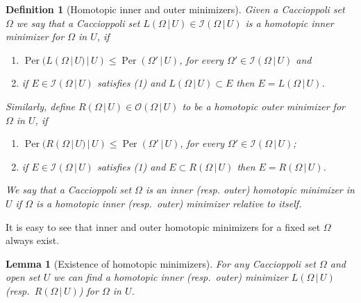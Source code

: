 \documentclass[12pt,twoside]{amsart}
\numberwithin{equation}{section}
\renewcommand{\leq}{\leqslant}
\newtheorem{lemma}[theorem]{Lemma}
\newtheorem{definition}[theorem]{Definition}
\newcommand{\cI}{\mathcal I}
\newcommand{\cO}{\mathcal O}
\DeclareMathOperator{\Per}{Per}
\begin{document}
\begin{definition}[Homotopic inner and outer minimizers] \label{homotopy minimizer}
	Given a Caccioppoli set $\Omega$ we say that a Caccioppoli set $L(\Omega\,|\, U)\in \cI(\Omega\,|\, U)$ is a \emph{homotopic inner minimizer for $\Omega$ in $U$}, if
	\begin{enumerate}
		\item $\Per(L(\Omega\,|\, U)\,|\, U)\leq \Per(\Omega'\,|\,U)$, for every $\Omega'\in \cI(\Omega\,|\, U)$ and
        \item if $E\in \cI(\Omega\,|\, U)$ satisfies (1) and $ L(\Omega\,|\, U) \subset E$ then $E= L(\Omega\,|\, U)$.
	\end{enumerate}
	Similarly, define $R(\Omega\,|\, U)\in \cO(\Omega\,|\, U)$ to be a \emph{homotopic outer minimizer for $\Omega$ in $U$}, if
	\begin{enumerate}
		\item $\Per( R(\Omega\,|\, U)\,|\,U)\leq \Per(\Omega'\,|\,U)$, for every $\Omega'\in \cI(\Omega\,|\, U)$;
\item if $E\in \cI(\Omega\,|\, U)$ satisfies (1) and $E \subset R(\Omega\,|\, U)$ then $E= R(\Omega\,|\, U)$.
	\end{enumerate}
	We say that a Caccioppoli set $\Omega$ is an \emph{inner (resp. outer) homotopic minimizer in $U$} if $\Omega$ is a homotopic inner (resp.\ outer) minimizer relative to itself. 
\end{definition}


It is easy to see that inner and outer homotopic minimizers for a fixed set $\Omega$ always exist.

\begin{lemma}[Existence of homotopic minimizers] \label{l:existence_homotopic}
	For any Caccioppoli set $\Omega$ and open set $U$	we can find a homotopic inner (resp.\ outer) minimizer $L(\Omega\,|\, U)$ (resp.\ $R(\Omega\,|\, U)$) for $\Omega$ in $U$. 
\end{lemma}
\end{document}
